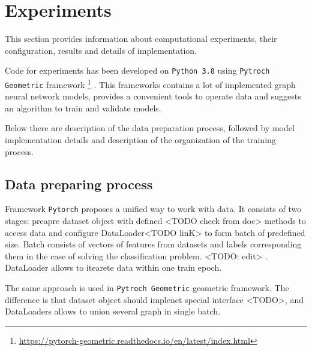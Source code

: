 \section{Experiments}
\label{sec:experiments}


This section provides information about computational experiments, their configuration, results and details
of implementation.

Code for experiments has been developed on \texttt{Python 3.8} using \texttt{Pytroch Geometric} framework
\footnote{\url{https://pytorch-geometric.readthedocs.io/en/latest/index.html}}
\cite{PyG}.
This frameworks contains a lot of implemented graph neural network models,
provides a convenient tools to operate data and suggests an algorithm to train and validate models.

Below there are description of the data preparation process, followed by model implementation details and description
of the organization of the training process.



\subsection{Data preparing process}

Framework \texttt{Pytorch} proposes a unified way to work with data.
It consists of two stages:
preapre dataset object with defined <TODO check from doc> methods to access data and configure DataLoader<TODO linK>
to form batch of predefined size. Batch consists of vectors of features from datasets and labels corresponding them
in the case of solving the classification problem. <TODO: edit> . DataLoader allows to
itearete data within one train epoch.

The same approach is used in \texttt{Pytroch Geometric} geometric framework. The difference is that
dataset object should implenet special interface <TODO>, and DataLoaders allows to union several graph in single batch.


